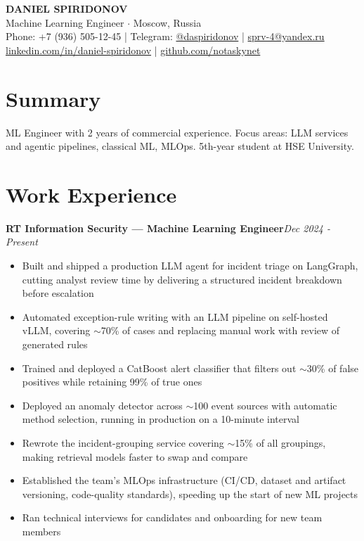 \documentclass[a4paper,11pt]{article}
\begin{document}
\pagestyle{empty}

\begin{center}
{\huge \textbf{DANIEL SPIRIDONOV}}\\[4pt]
Machine Learning Engineer $\cdot$ Moscow, Russia\\[2pt]
Phone: +7 (936) 505-12-45 | Telegram: \href{https://t.me/daspiridonov}{@daspiridonov} | \href{mailto:sprv-4@yandex.ru}{sprv-4@yandex.ru}\\
\href{https://www.linkedin.com/in/daniel-spiridonov/}{linkedin.com/in/daniel-spiridonov} | \href{https://github.com/notaskynet}{github.com/notaskynet}
\end{center}

\section*{Summary}
ML Engineer with 2 years of commercial experience. Focus areas: LLM services and agentic pipelines, classical ML, MLOps. 5th-year student at HSE University.

\section*{Work Experience}
\textbf{RT Information Security --- Machine Learning Engineer}\hfill \textit{Dec 2024 - Present}

\begin{itemize}
  \item Built and shipped a production LLM agent for incident triage on LangGraph, cutting analyst review time by delivering a structured incident breakdown before escalation
  \item Automated exception-rule writing with an LLM pipeline on self-hosted vLLM, covering \(\sim\)70\% of cases and replacing manual work with review of generated rules
  \item Trained and deployed a CatBoost alert classifier that filters out \(\sim\)30\% of false positives while retaining 99\% of true ones
  \item Deployed an anomaly detector across \(\sim\)100 event sources with automatic method selection, running in production on a 10-minute interval
  \item Rewrote the incident-grouping service covering \(\sim\)15\% of all groupings, making retrieval models faster to swap and compare
  \item Established the team's MLOps infrastructure (CI/CD, dataset and artifact versioning, code-quality standards), speeding up the start of new ML projects
  \item Ran technical interviews for candidates and onboarding for new team members
\end{itemize}
\end{document}
